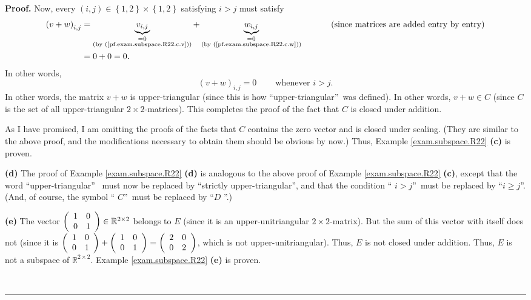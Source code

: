 \documentclass[numbers=enddot,12pt,final,onecolumn,notitlepage]{scrartcl}%
\theoremstyle{definition}
\newenvironment{proof}[1][Proof]{\noindent\textbf{#1.} }{\ \rule{0.5em}{0.5em}}
\begin{document}
\begin{proof}
Now, every $\left(  i,j\right)  \in\left\{  1,2\right\}  \times\left\{
1,2\right\}  $ satisfying $i>j$ must satisfy%
\begin{align*}
\left(  v+w\right)  _{i,j}  &  =\underbrace{v_{i,j}}_{\substack{=0\\\text{(by
(\ref{pf.exam.subspace.R22.c.v}))}}}+\underbrace{w_{i,j}}%
_{\substack{=0\\\text{(by (\ref{pf.exam.subspace.R22.c.w}))}}%
}\ \ \ \ \ \ \ \ \ \ \left(  \text{since matrices are added entry by
entry}\right) \\
&  =0+0=0.
\end{align*}
In other words,
\[
\left(  v+w\right)  _{i,j}=0\ \ \ \ \ \ \ \ \ \ \text{whenever }i>j.
\]
In other words, the matrix $v+w$ is upper-triangular (since this is how
\textquotedblleft upper-triangular\textquotedblright\ was defined). In other
words, $v+w\in C$ (since $C$ is the set of all upper-triangular $2\times
2$-matrices). This completes the proof of the fact that $C$ is closed under addition.

As I have promised, I am omitting the proofs of the facts that $C$ contains
the zero vector and is closed under scaling. (They are similar to the above
proof, and the modifications necessary to obtain them should be obvious by
now.) Thus, Example \ref{exam.subspace.R22} \textbf{(c)} is proven.

\textbf{(d)} The proof of Example \ref{exam.subspace.R22} \textbf{(d)} is
analogous to the above proof of Example \ref{exam.subspace.R22} \textbf{(c)},
except that the word \textquotedblleft upper-triangular\textquotedblright%
\ must now be replaced by \textquotedblleft strictly
upper-triangular\textquotedblright, and that the condition \textquotedblleft%
$i>j$\textquotedblright\ must be replaced by \textquotedblleft$i\geq
j$\textquotedblright. (And, of course, the symbol \textquotedblleft%
$C$\textquotedblright\ must be replaced by \textquotedblleft$D$%
\textquotedblright.)

\textbf{(e)} The vector $\left(
\begin{array}
[c]{cc}%
1 & 0\\
0 & 1
\end{array}
\right)  \in\mathbb{R}^{2\times2}$ belongs to $E$ (since it is an
upper-unitriangular $2\times2$-matrix). But the sum of this vector with itself
does not (since it is $\left(
\begin{array}
[c]{cc}%
1 & 0\\
0 & 1
\end{array}
\right)  +\left(
\begin{array}
[c]{cc}%
1 & 0\\
0 & 1
\end{array}
\right)  =\left(
\begin{array}
[c]{cc}%
2 & 0\\
0 & 2
\end{array}
\right)  $, which is not upper-unitriangular). Thus, $E$ is not closed under
addition. Thus, $E$ is not a subspace of $\mathbb{R}^{2\times2}$. Example
\ref{exam.subspace.R22} \textbf{(e)} is proven.


\end{proof}
\end{document}
